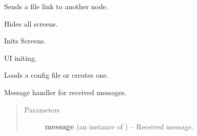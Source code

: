 \documentclass[letterpaper,10pt,english]{sphinxmanual}
\begin{document}
\begin{fulllineitems}

\begin{fulllineitems}
\label{wos:wos.GUI.HandleFileSend}
Sends a file link to another node.

\end{fulllineitems}


\begin{fulllineitems}
\label{wos:wos.GUI.HideScreens}
Hides all screens.

\end{fulllineitems}


\begin{fulllineitems}
\label{wos:wos.GUI.InitScreens}
Inits Screens.

\end{fulllineitems}


\begin{fulllineitems}
\label{wos:wos.GUI.InitUI}
UI initing.

\end{fulllineitems}


\begin{fulllineitems}
\label{wos:wos.GUI.LoadConfig}
Loads a config file or creates one.

\end{fulllineitems}


\begin{fulllineitems}
\label{wos:wos.GUI.MessageHandler}
Message handler for received messages.
\begin{quote}\begin{description}
\item[{Parameters}] \leavevmode
\textbf{message} (an instance of {\hyperref[swnp:swnp.Message]{}}) -- Received message.


\end{description}
\end{quote}
\end{fulllineitems}
\end{fulllineitems}
\end{document}
